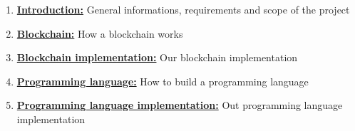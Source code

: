 \documentclass[../documentation.tex]{subfiles}
\begin{document}
\begin{enumerate}
    \item \hyperlink{section.1}{\textbf{Introduction:}}
        General informations, requirements and scope of the project
    
    \item \hyperlink{section.2}{\textbf{Blockchain:}}
        How a blockchain works
    
    \item \hyperlink{section.3}{\textbf{Blockchain implementation:}}
        Our blockchain implementation

    \item \hyperlink{section.4}{\textbf{Programming language:}}
        How to build a programming language

    \item \hyperlink{section.5}{\textbf{Programming language implementation:}}
        Out programming language implementation
\end{enumerate}
\end{document}
